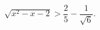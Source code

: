 \begin{ex}[type=inequality]
	\begin{condition}
		$\sqrt{x^2 - x - 2}>\dfrac{2}{5} - \dfrac{1}{\sqrt{6}}.$
	\end{condition}
\end{ex}